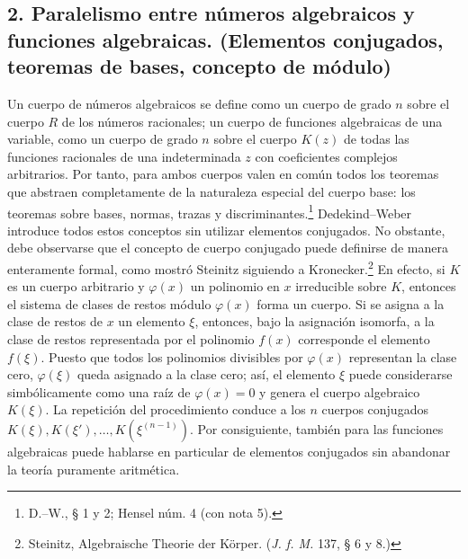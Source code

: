 \documentclass[11pt]{article}
\begin{document}
\subsection*{2. Paralelismo entre números algebraicos y funciones algebraicas. (Elementos conjugados, teoremas de bases, concepto de módulo)}
Un cuerpo de números algebraicos se define como un cuerpo de grado \(n\) sobre el cuerpo \(R\) de los números racionales; un cuerpo de funciones algebraicas de una variable, como un cuerpo de grado \(n\) sobre el cuerpo \(K(z)\) de todas las funciones racionales de una indeterminada \(z\) con coeficientes complejos arbitrarios. Por tanto, para ambos cuerpos valen en común todos los teoremas que abstraen completamente de la naturaleza especial del cuerpo base: los teoremas sobre bases, normas, trazas y discriminantes.\footnote{D.--W., § 1 y 2; Hensel núm. 4 (con nota 5).} Dedekind--Weber introduce todos estos conceptos sin utilizar elementos conjugados. No obstante, debe observarse que el concepto de cuerpo conjugado puede definirse de manera enteramente formal, como mostró Steinitz siguiendo a Kronecker.\footnote{Steinitz, Algebraische Theorie der Körper. (\emph{J. f. M.} 137, § 6 y 8.)} En efecto, si \(K\) es un cuerpo arbitrario y \(\varphi(x)\) un polinomio en \(x\) irreducible sobre \(K\), entonces el sistema de clases de restos módulo \(\varphi(x)\) forma un cuerpo. Si se asigna a la clase de restos de \(x\) un elemento \(\xi\), entonces, bajo la asignación isomorfa, a la clase de restos representada por el polinomio \(f(x)\) corresponde el elemento \(f(\xi)\). Puesto que todos los polinomios divisibles por \(\varphi(x)\) representan la clase cero, \(\varphi(\xi)\) queda asignado a la clase cero; así, el elemento \(\xi\) puede considerarse simbólicamente como una raíz de \(\varphi(x)=0\) y genera el cuerpo algebraico \(K(\xi)\). La repetición del procedimiento conduce a los \(n\) cuerpos conjugados \(K(\xi),K(\xi'),\ldots,K(\xi^{(n-1)})\). Por consiguiente, también para las funciones algebraicas puede hablarse en particular de elementos conjugados sin abandonar la teoría puramente aritmética.
\end{document}

